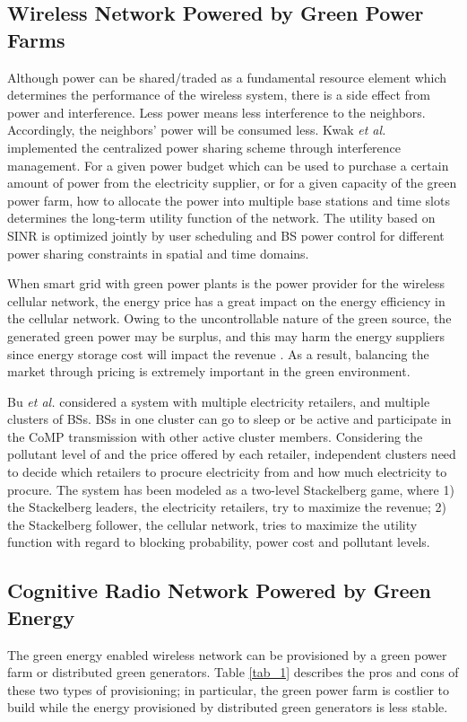 \documentclass[journal,12pt,onecolumn]{IEEEtran}
\begin{document}
{\subsection{Wireless Network Powered by Green Power Farms}
Although power can be shared/traded as a fundamental resource element which determines the performance of the wireless system, there is a side effect from power and interference. Less power means less interference to the neighbors. Accordingly, the neighbors' power will be consumed less. Kwak \emph{et al.} \cite{6319333} implemented the centralized power sharing scheme through interference management. For a given power budget which can be used to purchase a certain amount of power from the electricity supplier, or for a given capacity of the green power farm, how to allocate the power into multiple base stations and time slots determines the long-term utility function of the network. The utility based on SINR is optimized jointly by user scheduling and BS power control for different power sharing constraints in spatial and time domains.

When smart grid with green power plants is the power provider for the wireless cellular network, the energy price has a great impact on the energy efficiency in the cellular network. Owing to the uncontrollable nature of the green source, the generated green power may be surplus, and this may harm the energy suppliers since energy storage cost will impact the revenue \cite{5558703}. As a result, balancing the market through pricing is extremely important in the green environment. 

Bu \emph{et al.} \cite{6210335} considered a system with multiple electricity retailers, and multiple clusters of BSs. BSs in one cluster can go to sleep or be active and participate in the CoMP transmission with other active cluster members. Considering the pollutant level of and the price offered by each retailer, independent clusters need to decide which retailers to procure electricity from and how much electricity to procure. The system has been modeled as a two-level Stackelberg game, where 1) the Stackelberg leaders, the electricity retailers, try to maximize the revenue; 2) the Stackelberg follower, the cellular network, tries to maximize the utility function with regard to blocking probability, power cost and pollutant levels.

\subsection{Cognitive Radio Network Powered by Green Energy}
The green energy enabled wireless network can be provisioned by a green power farm or distributed green generators. Table \ref{tab_1} describes the pros and cons of these two types of provisioning; in particular, the green power farm is costlier to build while the energy provisioned by distributed green generators is less stable.

}
\end{document}
